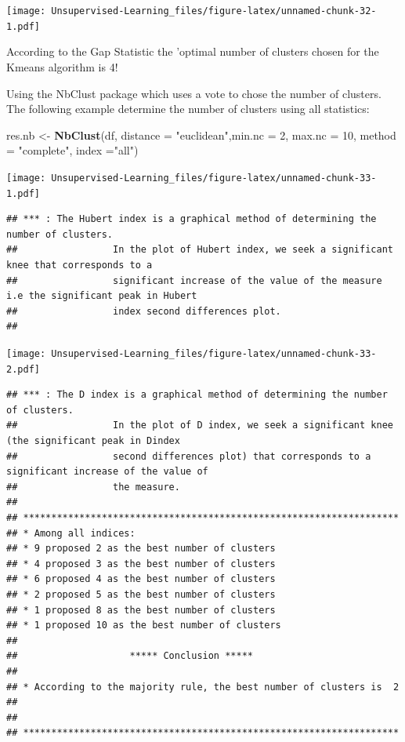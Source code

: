 \documentclass[
]{book}
\newenvironment{Shaded}{\begin{snugshade}}{\end{snugshade}}
\newcommand{\DataTypeTok}[1]{\textcolor[rgb]{0.13,0.29,0.53}{#1}}
\newcommand{\DecValTok}[1]{\textcolor[rgb]{0.00,0.00,0.81}{#1}}
\newcommand{\KeywordTok}[1]{\textcolor[rgb]{0.13,0.29,0.53}{\textbf{#1}}}
\newcommand{\NormalTok}[1]{#1}
\newcommand{\StringTok}[1]{\textcolor[rgb]{0.31,0.60,0.02}{#1}}
\begin{document}
\texttt{[image: Unsupervised-Learning\_files/figure-latex/unnamed-chunk-32-1.pdf]}

According to the Gap Statistic the 'optimal number of clusters chosen for the Kmeans algorithm is 4!

Using the NbClust package which uses a vote to chose the number of clusters.
The following example determine the number of clusters using all statistics:

\begin{Shaded}
\begin{Highlighting}[]
\NormalTok{res.nb <-}\StringTok{ }\KeywordTok{NbClust}\NormalTok{(df, }\DataTypeTok{distance =} \StringTok{"euclidean"}\NormalTok{,}\DataTypeTok{min.nc =} \DecValTok{2}\NormalTok{, max.nc}
\NormalTok{=}\StringTok{ }\DecValTok{10}\NormalTok{, }\DataTypeTok{method =} \StringTok{"complete"}\NormalTok{, }\DataTypeTok{index =}\StringTok{"all"}\NormalTok{)}
\end{Highlighting}
\end{Shaded}

\texttt{[image: Unsupervised-Learning\_files/figure-latex/unnamed-chunk-33-1.pdf]}

\begin{verbatim}
## *** : The Hubert index is a graphical method of determining the number of clusters.
##                 In the plot of Hubert index, we seek a significant knee that corresponds to a 
##                 significant increase of the value of the measure i.e the significant peak in Hubert
##                 index second differences plot. 
## 
\end{verbatim}

\texttt{[image: Unsupervised-Learning\_files/figure-latex/unnamed-chunk-33-2.pdf]}

\begin{verbatim}
## *** : The D index is a graphical method of determining the number of clusters. 
##                 In the plot of D index, we seek a significant knee (the significant peak in Dindex
##                 second differences plot) that corresponds to a significant increase of the value of
##                 the measure. 
##  
## ******************************************************************* 
## * Among all indices:                                                
## * 9 proposed 2 as the best number of clusters 
## * 4 proposed 3 as the best number of clusters 
## * 6 proposed 4 as the best number of clusters 
## * 2 proposed 5 as the best number of clusters 
## * 1 proposed 8 as the best number of clusters 
## * 1 proposed 10 as the best number of clusters 
## 
##                    ***** Conclusion *****                            
##  
## * According to the majority rule, the best number of clusters is  2 
##  
##  
## *******************************************************************
\end{verbatim}
\end{document}
